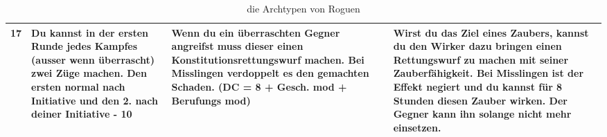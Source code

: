 \begin{table}
\begin{tabular}{cp{6cm}p{6cm}p{6cm}}
	17 &
	Du kannst in der ersten Runde jedes Kampfes (ausser wenn überrascht) zwei Züge machen. Den ersten normal nach Initiative und den 2. nach deiner Initiative - 10 &
	Wenn du ein überraschten Gegner angreifst muss dieser einen Konstitutionsrettungswurf machen. Bei Misslingen verdoppelt es den gemachten Schaden. (DC = 8 + Gesch. mod + Berufungs mod)&
	Wirst du das Ziel eines Zaubers, kannst du den Wirker dazu bringen einen Rettungswurf zu machen mit seiner Zauberfähigkeit. Bei Misslingen ist der Effekt negiert und du kannst für 8 Stunden diesen Zauber wirken. Der Gegner kann ihn solange nicht mehr einsetzen.\\ \hline
	\end{tabular}
	\caption{die Archtypen von Roguen}
\end{table}
